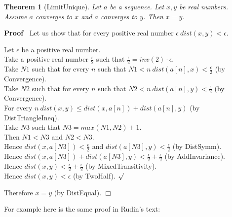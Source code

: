 \documentclass{article}
\newenvironment{forthel}{\begin{leftbar}}{\end{leftbar}}
\newenvironment{proof}{\noindent\textbf{Proof\ }}{\hspace*{\fill}$\Box$\medskip}
\newenvironment{subproof}{\begin{list}{}{}
		\item[\text{Proof}]}{\hfill $\surd$ \end{list}}
\newtheorem{theorem}{Theorem}
\newcommand{\halfeps}{\frac{\epsilon}{2}}
\begin{document}
\begin{forthel}
	\begin{theorem}[LimitUnique]
		Let $a$ be a sequence. Let $x, y$ be real numbers. Assume $a$ converges to $x$ and $a$ converges to $y$.
		Then $x = y$.
	\end{theorem}

	\begin{proof}
		Let us show that for every positive real number $\epsilon \ dist(x,y) < \epsilon$.
		\begin{subproof}
			Let $\epsilon$ be a positive real number.\\
			Take a positive real number $\halfeps$ such that $\halfeps = inv(2) \cdot \epsilon$.\\
			Take $N1$ such that for every $n$ such that $N1 < n \ dist(a[n],x) < \halfeps$ (by Convergence).\\
			Take $N2$ such that for every $n$ such that $N2 < n \ dist(a[n],y) < \halfeps$ (by Convergence).\\
			For every $n \ dist(x,y) \leq dist(x,a[n]) + dist(a[n],y)$ (by DistTriangleIneq). \\
			Take $N3$ such that $N3 = max(N1,N2) + 1$.\\
			Then $N1 < N3$ and $N2 < N3$.\\
			Hence $dist(x,a[N3]) < \halfeps$ and $dist(a[N3],y) < \halfeps$ (by DistSymm).\\
			Hence $dist(x,a[N3]) + dist(a[N3],y) < \halfeps + \halfeps$ (by AddInvariance).\\
			Hence $dist(x,y) < \halfeps + \halfeps$ (by MixedTransitivity).\\
			Hence $dist(x,y) < \epsilon$ (by TwoHalf).
		\end{subproof}
		Therefore $x = y$ (by DistEqual).
	\end{proof}
\end{forthel}

\newpage
\noindent For example here is the same proof in Rudin's text:\\

\\
\end{document}
